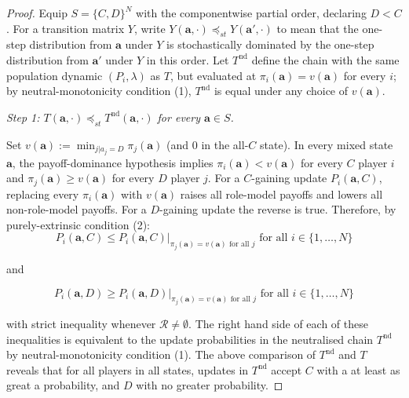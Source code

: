 \documentclass{article}
\begin{document}
\begin{proof}

    Equip \(S = \{C, D\}^N\) with the componentwise partial order, declaring \(D
    < C\). For a transition matrix \(Y\), write \(Y(\mathbf{a}, \cdot)
    \preceq_{st} Y(\mathbf{a}', \cdot)\) to mean that the one-step distribution
    from \(\mathbf{a}\) under \(Y\) is stochastically dominated by the one-step
    distribution from \(\mathbf{a}'\) under \(Y\) in this order. Let
    \(T^{\mathrm{nd}}\) define the chain with the same population dynamic
    \((P_i, \lambda)\) as \(T\), but evaluated at \(\pi_i(\mathbf{a}) =
    v(\mathbf{a})\) for every \(i\); by neutral-monotonicity condition (1),
    \(T^{\mathrm{nd}}\) is equal under any choice of \(v(\mathbf{a})\).

    \medskip
    \noindent\textit{Step 1: \(T(\mathbf{a}, \cdot) \preceq_{st}
    T^{\mathrm{nd}}(\mathbf{a}, \cdot)\) for every \(\mathbf{a} \in S\).}

    Set \(v(\mathbf{a}) := \min_{j|a_j = D} \pi_j(\mathbf{a})\) (and 0 in the
    all-\(C\) state). In every mixed state \(\mathbf{a}\), the payoff-dominance
    hypothesis implies \(\pi_i(\mathbf{a}) < v(\mathbf{a})\) for every \(C\)
    player \(i\) and \(\pi_j(\mathbf{a}) \geq v(\mathbf{a})\) for every \(D\)
    player \(j\). For a \(C\)-gaining update \(P_i(\mathbf{a}, C)\), replacing
    every \(\pi_i(\mathbf{a})\) with \(v(\mathbf{a})\) raises all role-model
    payoffs and lowers all non-role-model payoffs. For a \(D\)-gaining update
    the reverse is true. Therefore, by purely-extrinsic condition (2):
    \[
        P_i(\mathbf{a}, C) \leq P_i(\mathbf{a}, C) \big|_{\pi_j(\mathbf{a}) = v(\mathbf{a})\text{ for all } j} \text{ for all }i \in \{1, \dots, N\}
    \]

    and

    \[
        P_i(\mathbf{a}, D) \geq P_i(\mathbf{a}, D) \big|_{\pi_j(\mathbf{a}) = v(\mathbf{a})\text{ for all } j} \text{ for all }i \in \{1, \dots, N\}
    \]

    with strict inequality whenever \(\mathcal{R} \neq \emptyset\). The right
    hand side of each of these inequalities is equivalent to the update
    probabilities in the neutralised chain \(T^{\mathrm{nd}}\) by
    neutral-monotonicity condition (1). The above comparison of
    \(T^{\mathrm{nd}}\) and \(T\) reveals that for all players in all states,
    updates in \(T^{\mathrm{nd}}\) accept \(C\) with a at least as great a
    probability, and \(D\) with no greater probability.
    

\end{proof}
\end{document}
